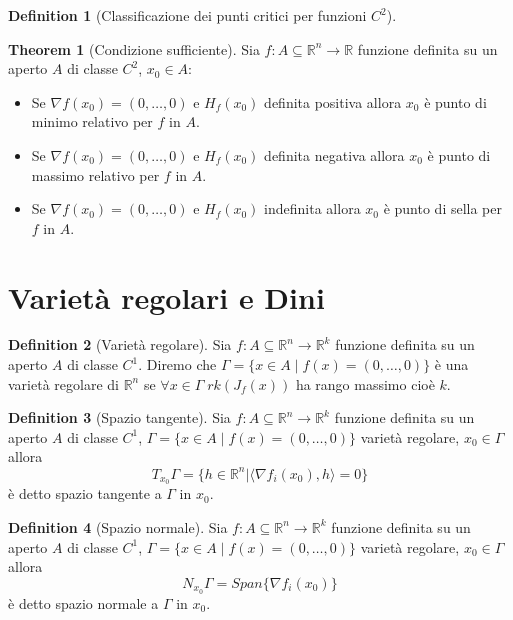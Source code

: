 \documentclass[leqno]{article}
\theoremstyle{definition}
\newtheorem{definition}{Definition}[section]
\numberwithin{equation}{section}
\newtheorem{theorem}{Theorem}[section]
\theoremstyle{remark}
\begin{document}
	\begin{definition}[Classificazione dei punti critici per funzioni $C^2$]
		\begin{theorem}[Condizione sufficiente]
			Sia $f:A\subseteq \mathbb{R}^n \rightarrow \mathbb{R}$ funzione definita su un aperto $A$ di classe $C^2$, $x_0\in A$:
			\begin{itemize}
				\item Se $\nabla f(x_0)=(0,\dots,0)$ e $H_f(x_0)$ definita positiva allora $x_0$ è punto di minimo relativo per $f$ in $A$.
				\item Se $\nabla f(x_0)=(0,\dots,0)$ e $H_f(x_0)$ definita negativa allora $x_0$ è punto di massimo relativo per $f$ in $A$.
				\item Se $\nabla f(x_0)=(0,\dots,0)$ e $H_f(x_0)$ indefinita allora $x_0$ è punto di sella per $f$ in $A$.
			\end{itemize}
		\end{theorem}
	\end{definition}
	
	\section{Varietà regolari e Dini}
	\begin{definition}[Varietà regolare]
		Sia $f:A\subseteq \mathbb{R}^n \rightarrow \mathbb{R}^{k}$ funzione definita su un aperto $A$ di classe $C^1$. Diremo che $\Gamma=\{ x \in A \; | \; f(x)=(0,\dots,0)\}$ è una varietà regolare di $\mathbb{R}^n$ se $\forall x \in \Gamma \; rk(J_f(x))$ ha rango massimo cioè $k$.
	\end{definition}
	\begin{definition}[Spazio tangente]
		Sia $f:A\subseteq \mathbb{R}^n \rightarrow \mathbb{R}^{k}$ funzione definita su un aperto $A$ di classe $C^1$, $\Gamma=\{ x \in A \; | \; f(x)=(0,\dots,0)\}$ varietà regolare, $x_0\in \Gamma$ allora
		\begin{equation}
			T_{x_0}\Gamma=\{h\in \mathbb{R}^n | \langle \nabla f_i(x_0), h \rangle = 0\}
		\end{equation}
		è detto spazio tangente a $\Gamma$ in $x_0$.
	\end{definition}
	\begin{definition}[Spazio normale]
		Sia $f:A\subseteq \mathbb{R}^n \rightarrow \mathbb{R}^{k}$ funzione definita su un aperto $A$ di classe $C^1$, $\Gamma=\{ x \in A \; | \; f(x)=(0,\dots,0)\}$ varietà regolare, $x_0\in \Gamma$ allora
		\begin{equation}
			N_{x_0}\Gamma=Span\{\nabla f_i (x_0)\}
		\end{equation}
		è detto spazio normale a $\Gamma$ in $x_0$.
	\end{definition}
	
\end{document}
